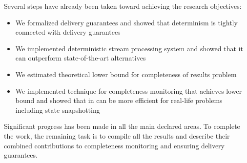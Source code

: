 \label{phd_progress}

Several steps have already been taken toward achieving the research objectives:

\begin{itemize}
\item We formalized delivery guarantees and showed that determinism is tightly connected with delivery guarantees~\cite{thepaper, we2018seim, trofimov2018consistency}
\item We implemented deterministic stream processing system and showed that it can outperform state-of-the-art alternatives~\cite{we2018adbis, we2018beyondmr, webirte}
\item We estimated theoretical lower bound for completeness of results problem~\cite{10.1145/3524860.3539809, trofimov2023bounding}
\item We implemented technique for completeness monitoring that achieves lower bound and showed that in can be more efficient for real-life problems including state snapshotting~\cite{10.1145/3524860.3539809, trofimov2023bounding}
\end{itemize}

Significant progress has been made in all the main declared areas. To complete the work, the remaining task is to compile all the results and describe their combined contributions to completeness monitoring and ensuring delivery guarantees.